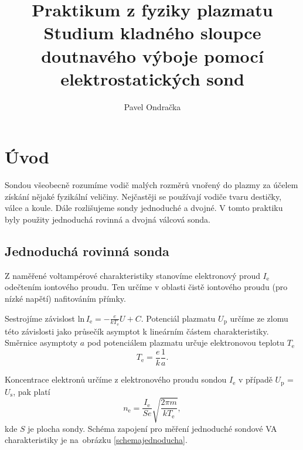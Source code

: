 \documentclass[12pt]{article}
\begin{document}
\title{Praktikum z fyziky plazmatu \\
Studium kladného sloupce doutnavého výboje pomocí elektrostatických sond}
\author{Pavel Ondračka}
\maketitle

\section{Úvod}
Sondou všeobecně rozumíme vodič malých rozměrů vnořený do plazmy za účelem získání nějaké fyzikální veličiny. Nejčastěji se používají vodiče tvaru destičky, válce a koule. Dále rozlišujeme sondy jednoduché a dvojné. V tomto praktiku byly použity jednoduchá rovinná a dvojná válcová sonda.

\subsection{Jednoduchá rovinná sonda}
Z naměřené voltampérové charakteristiky stanovíme elektronový proud $I_\mathrm{e}$ odečtením iontového proudu. Ten určíme v oblasti čistě iontového proudu (pro nízké napětí) nafitováním přímky.

 Sestrojíme závislost $\mathrm{ln}\,I_\mathrm{e} = -\frac{e}{k T_\mathrm{e}}U + C$. Potenciál plazmatu $U_\mathrm{p}$ určíme ze zlomu této závislosti jako průsečík asymptot k lineárním částem charakteristiky. Směrnice asymptoty $a$ pod potenciálem plazmatu určuje elektronovou teplotu $T_\mathrm{e}$
\begin{equation}
T_\mathrm{e} = \frac{e}{k} \frac{1}{a} \mathrm{.}
\end{equation}

Koncentrace elektronů určíme z elektronového proudu sondou $I_\mathrm{e}$ v případě $U_\mathrm{p}$ = $U_\mathrm{s}$, pak platí
\begin{equation}
n_\mathrm{e} = \frac{I_\mathrm{e}}{S e} \sqrt{\frac{2 \pi m}{k T_\mathrm{e}}} \mathrm{,}
\end{equation}
kde $S$ je plocha sondy. Schéma zapojení pro měření jednoduché sondové VA charakteristiky je na~obrázku \ref{schemajednoducha}. 
\end{document}
